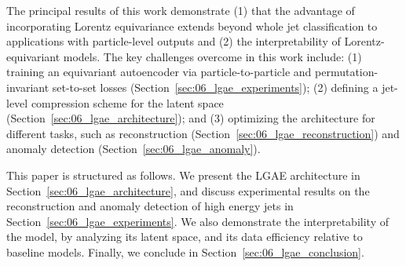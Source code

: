 The principal results of this work demonstrate (1) that the advantage of incorporating Lorentz equivariance extends beyond whole jet classification to applications with particle-level outputs and (2) the interpretability of Lorentz-equivariant models.
The key challenges overcome in this work include: (1) training an equivariant autoencoder via particle-to-particle and permutation-invariant set-to-set losses (Section~\ref{sec:06_lgae_experiments}); (2) defining a jet-level compression scheme for the latent space (Section~\ref{sec:06_lgae_architecture}); and (3) optimizing the architecture for different tasks, such as reconstruction (Section~\ref{sec:06_lgae_reconstruction}) and anomaly detection (Section~\ref{sec:06_lgae_anomaly}).

This paper is structured as follows.
We present the LGAE architecture in Section~\ref{sec:06_lgae_architecture}, and discuss experimental results on the reconstruction and anomaly detection of high energy jets in Section~\ref{sec:06_lgae_experiments}.
We also demonstrate the interpretability of the model, by analyzing its latent space, and its data efficiency relative to baseline models.
Finally, we conclude in Section~\ref{sec:06_lgae_conclusion}.





